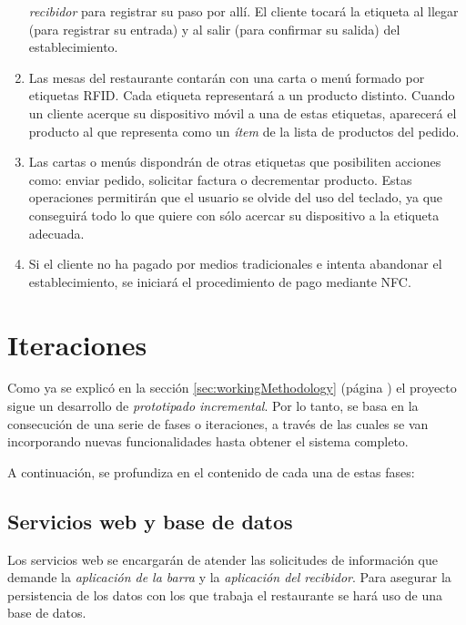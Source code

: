 \begin{enumerate}
\emph{recibidor} para registrar su paso por allí. El cliente tocará la
etiqueta al llegar (para registrar su entrada) y al salir (para confirmar
su salida) del establecimiento.
\item Las mesas del restaurante contarán con una carta o menú formado por
etiquetas \acs{RFID}. Cada etiqueta representará a un producto distinto.
Cuando un cliente acerque su dispositivo móvil a una de estas etiquetas,
aparecerá el producto al que representa como un \emph{ítem} de la lista de
productos del pedido.
\item Las cartas o menús dispondrán de otras etiquetas que posibiliten acciones
como: enviar pedido, solicitar factura o decrementar producto. Estas
operaciones permitirán que el usuario se olvide del uso del teclado, ya que
conseguirá todo lo que quiere con sólo acercar su dispositivo a la etiqueta
adecuada.
\item Si el cliente no ha pagado por medios tradicionales e intenta abandonar
el establecimiento, se iniciará el procedimiento de pago mediante \acs{NFC}.
\end{enumerate}

\section{Iteraciones}
Como ya se explicó en la sección \ref{sec:workingMethodology} (página
\pageref{sec:workingMethodology}) el proyecto sigue un desarrollo de
\emph{prototipado incremental}. Por lo tanto, se basa en la consecución de una
serie de fases o iteraciones, a través de las cuales se van incorporando nuevas
funcionalidades hasta obtener el sistema completo.

A continuación, se profundiza en el contenido de cada una de estas fases:

\subsection{Servicios web y base de datos}
Los servicios web se encargarán de atender las solicitudes de información que
demande la \emph{aplicación de la barra} y la \emph{aplicación del recibidor}.
Para asegurar la persistencia de los datos con los que trabaja el restaurante
se hará uso de una base de datos.

